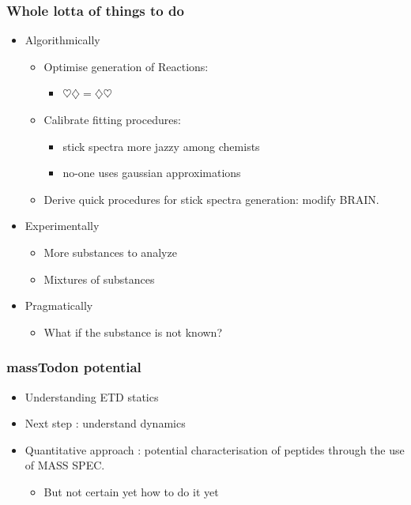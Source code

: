 \documentclass[xetex]{beamer}
\begin{document}
	\begin{frame}\frametitle{Whole lotta of things to do}
		\begin{itemize}
			\item Algorithmically 
			\begin{itemize}
				\item Optimise generation of Reactions: 
				\begin{itemize}
					\item $\heartsuit \diamondsuit = \diamondsuit \heartsuit$
				\end{itemize}
				\item Calibrate fitting procedures: 
				\begin{itemize}
					\item stick spectra more jazzy among chemists
					\item no-one uses gaussian approximations
				\end{itemize}
				\item Derive quick procedures for stick spectra generation: modify BRAIN.
			\end{itemize}
			\item Experimentally
			\begin{itemize}
				\item More substances to analyze
				\item Mixtures of substances 
			\end{itemize}
			\item Pragmatically
			\begin{itemize}
				\item What if the substance is not known?
			\end{itemize}
		\end{itemize}
	\end{frame}

	\begin{frame}\frametitle{massTodon potential}
		\begin{itemize}
			\item Understanding ETD statics
			\item Next step : understand dynamics
			\item Quantitative approach : potential characterisation of peptides through the use of MASS SPEC.
			\begin{itemize}
				\item But not certain yet how to do it yet
			\end{itemize}

		\end{itemize}
	\end{frame}
\end{document}
